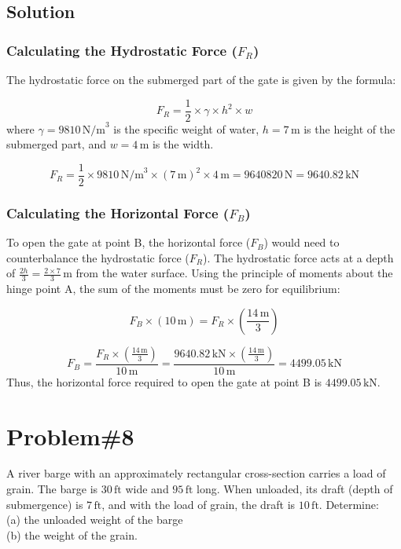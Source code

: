 \documentclass[12pt]{article}
\begin{document}
\subsection*{Solution}

\subsubsection*{Calculating the Hydrostatic Force (\(F_R\))}
The hydrostatic force on the submerged part of the gate is given by the formula:

\[
F_R = \frac{1}{2} \times \gamma \times h^2 \times w
\]
where \( \gamma = 9810 \, \text{N/m}^3 \) is the specific weight of water, \( h = 7 \, \text{m} \) is the height of the submerged part, and \( w = 4 \, \text{m} \) is the width.

\[
F_R = \frac{1}{2} \times 9810 \, \text{N/m}^3 \times (7 \, \text{m})^2 \times 4 \, \text{m} = 9640820 \, \text{N} = 9640.82 \, \text{kN}
\]

\subsubsection*{Calculating the Horizontal Force (\(F_B\))}
To open the gate at point B, the horizontal force (\(F_B\)) would need to counterbalance the hydrostatic force (\(F_R\)). The hydrostatic force acts at a depth of \(\frac{2h}{3} = \frac{2\times7}{3} \, \text{m} \) from the water surface.
\newline \newline
Using the principle of moments about the hinge point A, the sum of the moments must be zero for equilibrium:

\[
F_B \times (10 \, \text{m}) = F_R \times \left( \frac{14 \, \text{m}}{3} \right)
\]

\[
F_B = \frac{F_R \times \left( \frac{14 \, \text{m}}{3} \right)}{10 \, \text{m}} = \frac{9640.82 \, \text{kN} \times \left( \frac{14 \, \text{m}}{3} \right)}{10 \, \text{m}} = 4499.05 \, \text{kN}
\]
Thus, the horizontal force required to open the gate at point B is \(4499.05 \, \text{kN}\).

\newpage
\section*{Problem\#8}
A river barge with an approximately rectangular cross-section carries a load of grain. The barge is \(30 \, \text{ft}\) wide and \(95 \, \text{ft}\) long. When unloaded, its draft (depth of submergence) is \(7 \, \text{ft}\), and with the load of grain, the draft is \(10 \, \text{ft}\). Determine: \\
(a) the unloaded weight of the barge \\
(b) the weight of the grain.
\end{document}
